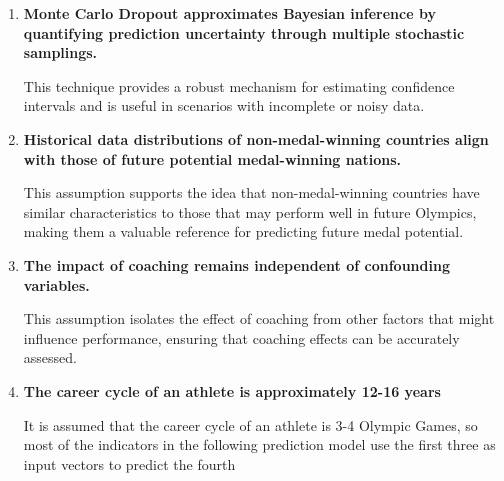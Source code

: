 \documentclass{mcmthesis}
\begin{document}
\begin{enumerate}[leftmargin=0.15in, labelsep=0.1in, itemsep=10pt, parsep=7pt]
	
	\item \textbf{Monte Carlo Dropout approximates Bayesian inference by quantifying prediction uncertainty through multiple stochastic samplings.}
	
	This technique provides a robust mechanism for estimating confidence intervals and is useful in scenarios with incomplete or noisy data.
	
	\item \textbf{Historical data distributions of non-medal-winning countries align with those of future potential medal-winning nations.} 
	
	This assumption supports the idea that non-medal-winning countries have similar characteristics to those that may perform well in future Olympics, making them a valuable reference for predicting future medal potential.
	
	\item \textbf{The impact of coaching remains independent of confounding variables.}
			
	This assumption isolates the effect of coaching from other factors that might influence performance, ensuring that coaching effects can be accurately assessed.
	\item \textbf{The career cycle of an athlete is approximately 12-16 years}
	
	It is assumed that the career cycle of an athlete is 3-4 Olympic Games, so most of the indicators in the following prediction model use the first three as input vectors to predict the fourth
\end{enumerate}
%
\end{document}
